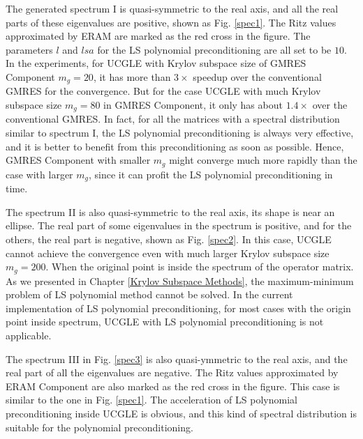 The generated spectrum I is quasi-symmetric to the real axis, and all the real parts of these eigenvalues are positive, shown as Fig. \ref{spec1}. The Ritz values approximated by ERAM are marked as the red cross in the figure. The parameters $l$ and $lsa$ for the LS polynomial preconditioning are all set to be $10$. In the experiments, for UCGLE with Krylov subspace size of GMRES Component $m_g=20$, it has more than $3\times$ speedup over the conventional GMRES for the convergence. But for the case UCGLE with much Krylov subspace size $m_g=80$ in GMRES Component, it only has about $1.4\times$ over the conventional GMRES. In fact, for all the matrices with a spectral distribution similar to spectrum I, the LS polynomial preconditioning is always very effective, and it is better to benefit from this preconditioning as soon as possible. Hence, GMRES Component with smaller $m_g$ might converge much more rapidly than the case with larger $m_g$, since it can profit the LS polynomial preconditioning in time.

The spectrum II is also quasi-symmetric to the real axis, its shape is near an ellipse. The real part of some eigenvalues in the spectrum is positive, and for the others, the real part is negative, shown as Fig. \ref{spec2}. In this case, UCGLE cannot achieve the convergence even with much larger Krylov subspace size $m_g=200$. When the original point is inside the spectrum of the operator matrix. As we presented in Chapter \ref{Krylov Subspace Methods}, the maximum-minimum problem of LS polynomial method cannot be solved. In the current implementation of LS polynomial preconditioning, for most cases with the origin point inside spectrum, UCGLE with LS polynomial preconditioning is not applicable.

The spectrum III in Fig. \ref{spec3} is also quasi-ymmetric to the real axis, and the real part of all the eigenvalues are negative. The Ritz values approximated by ERAM Component are also marked as the red cross in the figure. This case is similar to the one in Fig. \ref{spec1}. The acceleration of LS polynomial preconditioning inside UCGLE is obvious, and this kind of spectral distribution is suitable for the polynomial preconditioning.

